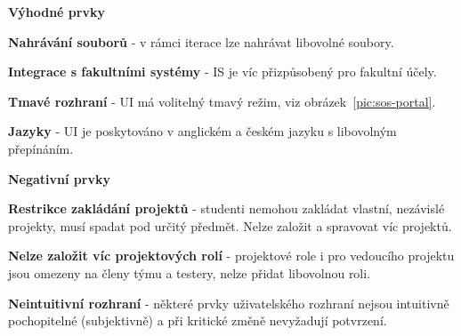 \textbf{Výhodné prvky}

\begin{ul}
   \item
   \textbf{Nahrávání souborů} - v rámci iterace lze nahrávat libovolné soubory.
   \item
   \textbf{Integrace s fakultními systémy} - \gls{IS} je víc přizpůsobený pro fakultní účely.
   \item
   \textbf{Tmavé rozhraní} - \gls{UI} má volitelný tmavý režim, viz obrázek~\ref{pic:sos-portal}.
   \item
   \textbf{Jazyky} - \gls{UI} je poskytováno v anglickém a českém jazyku s libovolným přepínáním.
\end{ul}


\textbf{Negativní prvky}

\begin{ul}
   \item
   \textbf{Restrikce zakládání projektů} - studenti nemohou zakládat vlastní, nezávislé projekty, musí spadat pod určitý předmět.
   Nelze založit a spravovat víc projektů.
   \item
   \textbf{Nelze založit víc projektových rolí} - projektové role i pro vedoucího projektu jsou omezeny na členy týmu a testery, nelze přidat libovolnou roli.
   \item
   \textbf{Neintuitivní rozhraní} - některé prvky uživatelského rozhraní nejsou intuitivně pochopitelné (subjektivně) a při kritické změně nevyžadují potvrzení.
\end{ul}
